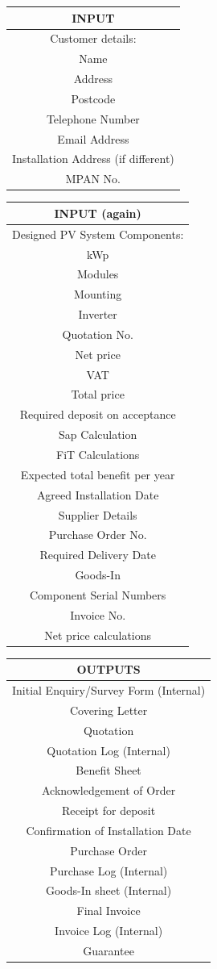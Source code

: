 \begin{tabular}{ | c | }
	\hline
\textbf{INPUT}\\
\hline
Customer details:\\
\hline
Name\\
Address\\
Postcode\\
Telephone Number\\
Email Address\\
Installation Address (if different)\\
MPAN No.\\
\hline
\end{tabular}
\begin{tabular}{ | c | }
\hline
\textbf{INPUT (again)}\\
\hline
Designed PV System Components:\\
\hline
kWp\\
Modules\\
Mounting\\
Inverter\\
\hline
Quotation No.\\
Net price\\
VAT\\ 
Total price\\
Required deposit on acceptance\\
Sap Calculation\\
FiT Calculations\\
Expected total benefit per year\\
Agreed Installation Date\\
Supplier Details\\
Purchase Order No.\\
Required Delivery Date\\
Goods-In\\
Component Serial Numbers\\
Invoice No.\\
Net price calculations\\
\hline
\end{tabular}
\begin{tabular}{ | c | }
	\hline
\textbf{OUTPUTS}\\
\hline
Initial Enquiry/Survey Form (Internal)\\
Covering Letter\\
Quotation\\
Quotation Log (Internal)\\
Benefit Sheet\\
Acknowledgement of Order\\
Receipt for deposit\\
Confirmation of Installation Date\\
Purchase Order\\
Purchase Log (Internal)\\
Goods-In sheet (Internal)\\
Final Invoice\\
Invoice Log (Internal)\\
Guarantee\\
\hline
\end{tabular}

